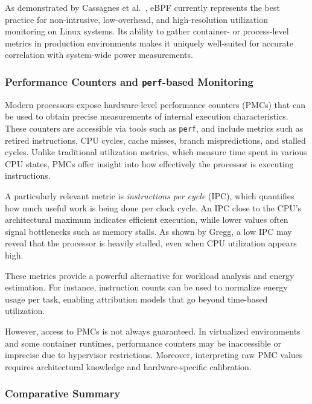 As demonstrated by Cassagnes et al.~\parencite{cassagnesRiseEBPFNonintrusive2020}, eBPF currently represents the best practice for non-intrusive, low-overhead, and high-resolution utilization monitoring on Linux systems. Its ability to gather container- or process-level metrics in production environments makes it uniquely well-suited for accurate correlation with system-wide power measurements.

\subsubsection{Performance Counters and \texttt{perf}-based Monitoring}
\label{sec:perf_metrics}

Modern processors expose hardware-level performance counters (PMCs) that can be used to obtain precise measurements of internal execution characteristics. These counters are accessible via tools such as \texttt{perf}, and include metrics such as retired instructions, CPU cycles, cache misses, branch mispredictions, and stalled cycles. Unlike traditional utilization metrics, which measure time spent in various CPU states, PMCs offer insight into how effectively the processor is executing instructions.

A particularly relevant metric is \textit{instructions per cycle} (IPC), which quantifies how much useful work is being done per clock cycle. An IPC close to the CPU's architectural maximum indicates efficient execution, while lower values often signal bottlenecks such as memory stalls. As shown by Gregg\parencite{Gregg2017CpuUtilizationWrong}, a low IPC may reveal that the processor is heavily stalled, even when CPU utilization appears high.

These metrics provide a powerful alternative for workload analysis and energy estimation. For instance, instruction counts can be used to normalize energy usage per task, enabling attribution models that go beyond time-based utilization.

However, access to PMCs is not always guaranteed. In virtualized environments and some container runtimes, performance counters may be inaccessible or imprecise due to hypervisor restrictions. Moreover, interpreting raw PMC values requires architectural knowledge and hardware-specific calibration.

\subsubsection{Comparative Summary}

